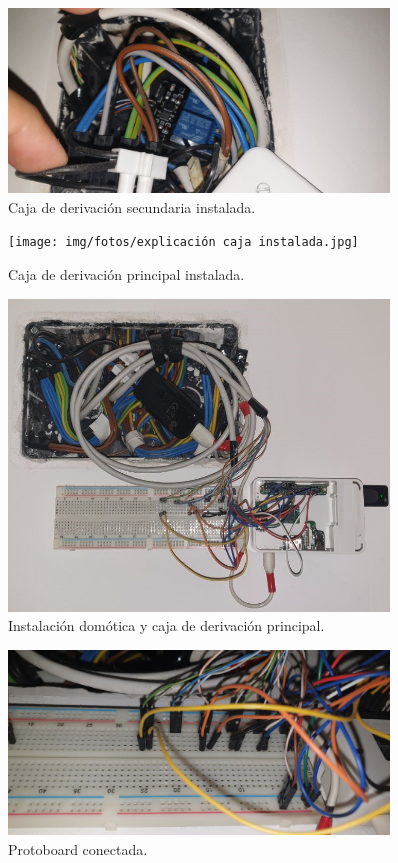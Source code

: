 \begin{figure}[h]
    \centering
    \includegraphics[width=0.9\textwidth]{img/fotos/caja-persiana.jpeg}
    \caption{Caja de derivación secundaria instalada.} \label{Img:CajaDerivacion}
\end{figure}
\begin{figure}[h]
    \centering
    \texttt{[image: img/fotos/explicación caja instalada.jpg]}
    \caption{Caja de derivación principal instalada.} \label{Img:CajaDerivacionPrincipal}
\end{figure}
\begin{figure}[h]
    \centering
    \includegraphics[width=0.9\textwidth]{img/fotos/RBP-instalada.jpeg}
    \caption{Instalación domótica y caja de derivación principal.} \label{Img:InstalacionDomotica}
\end{figure}
\begin{figure}[h]
    \centering
    \includegraphics[width=0.9\textwidth]{img/fotos/protoboard-instalada.jpeg}
    \caption{Protoboard conectada.} \label{Img:ProtoboardConecada}
\end{figure}

